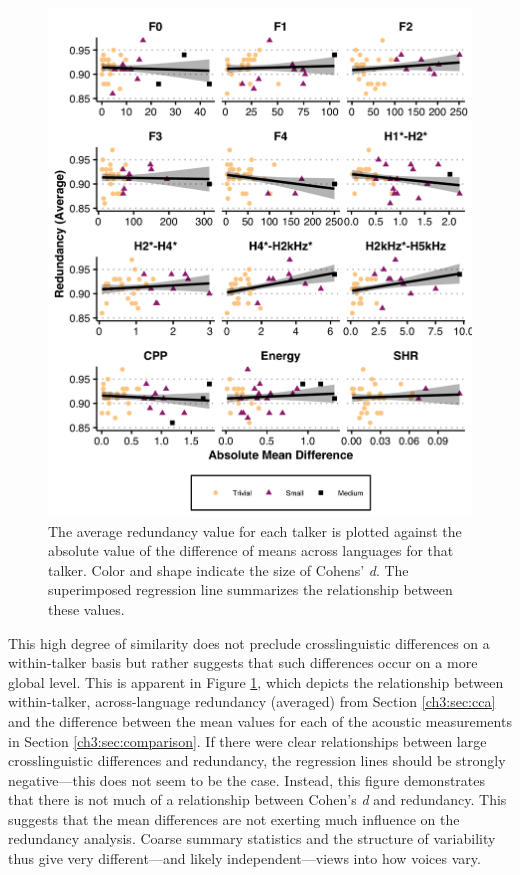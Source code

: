 \begin{figure}[htbp]
    \begin{center}
    \includegraphics[width=0.85\linewidth]{figures/ch3_redundancybyttestdiff_5in.png} 
    \caption{The average redundancy value for each talker is plotted against the absolute value of the difference of means across languages for that talker. Color and shape indicate the size of Cohens' \textit{d}. The superimposed regression line summarizes the relationship between these values.}
    \label{ch3:fig:diffbyred}
    \end{center}
\end{figure}

This high degree of similarity does not preclude crosslinguistic differences on a within-talker basis but rather suggests that such differences occur on a more global level. This is apparent in Figure \ref{ch3:fig:diffbyred}, which depicts the relationship between within-talker, across-language redundancy (averaged) from Section \ref{ch3:sec:cca} and the difference between the mean values for each of the acoustic measurements in Section \ref{ch3:sec:comparison}. If there were clear relationships between large crosslinguistic differences and redundancy, the regression lines should be strongly negative---this does not seem to be the case. Instead, this figure demonstrates that there is not much of a relationship between Cohen's \textit{d} and redundancy. This suggests that the mean differences are not exerting much influence on the redundancy analysis. Coarse summary statistics and the structure of variability thus give very different---and likely independent---views into how voices vary.

